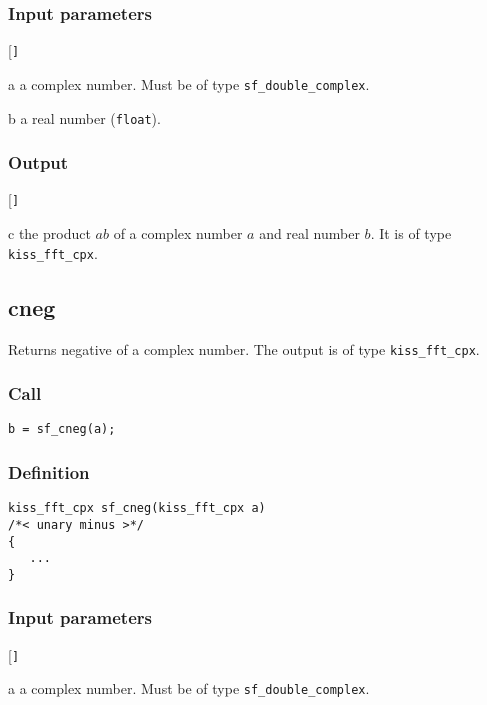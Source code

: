 \subsubsection*{Input parameters}
\begin{desclist}{\tt }{\quad}[\tt ]
   \setlength\itemsep{0pt}
   \item[a] a complex number. Must be of type \texttt{sf\_double\_complex}.  
   \item[b] a real number (\texttt{float}).  
\end{desclist}

\subsubsection*{Output}
\begin{desclist}{\tt }{\quad}[\tt ]
   \setlength\itemsep{0pt}
   \item[c] the product $ab$ of a complex number $a$ and real number $b$. It is of type \texttt{kiss\_fft\_cpx}.
\end{desclist}




\subsection{{cneg}}
Returns negative of a complex number. The output is of type \texttt{kiss\_fft\_cpx}.

\subsubsection*{Call}
\begin{verbatim}b = sf_cneg(a);\end{verbatim}

\subsubsection*{Definition}
\begin{verbatim}
kiss_fft_cpx sf_cneg(kiss_fft_cpx a)
/*< unary minus >*/
{
   ...
}
\end{verbatim}

\subsubsection*{Input parameters}
\begin{desclist}{\tt }{\quad}[\tt ]
   \setlength\itemsep{0pt}
   \item[a] a complex number. Must be of type \texttt{sf\_double\_complex}.  
\end{desclist}

